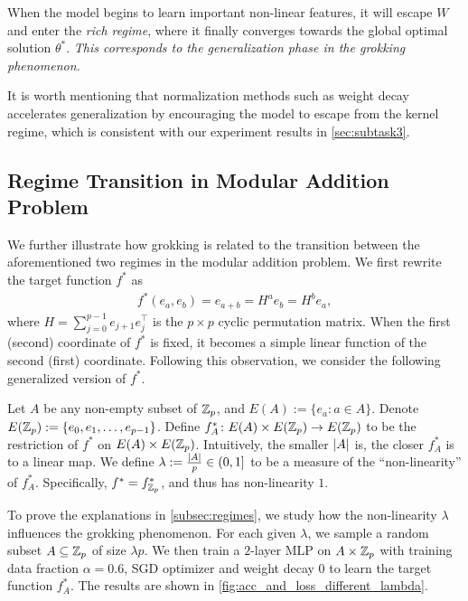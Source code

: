 When the model begins to learn important non-linear features, it will escape $W$ and enter the \emph{rich regime}, where it finally converges towards the global optimal solution $\theta^*$.
\emph{This corresponds to the generalization phase in the grokking phenomenon.}

It is worth mentioning that normalization methods such as weight decay accelerates generalization by encouraging the model to escape from the kernel regime, which is consistent with our experiment results in \cref{sec:subtask3}.


\subsection{Regime Transition in Modular Addition Problem}
\label{subsec:explain_by_regimes}

We further illustrate how grokking is related to the transition between the aforementioned two regimes in the modular addition problem.
We first rewrite the target function $f^*$ as 
\begin{align*}
    f^*(e_a, e_b) = e_{a+b} = H^a e_b = H^b e_a, 
\end{align*}
where $H = \sum_{j=0}^{p-1} e_{j+1} e_{j}^\top$ is the $p \times p$ cyclic permutation matrix.
When the first (second) coordinate of $f^*$ is fixed, it becomes a simple linear function of the second (first) coordinate.
Following this observation, we consider the following generalized version of $f^*$.

Let $A$ be any non-empty subset of $\mathbb{Z}_p$, and $E(A) := \{e_a \colon a \in A\}$. Denote $E(\mathbb{Z}_p) := \{e_0, e_1, \dots, e_{p-1}\}$.
Define $f_A^* \colon E(A) \times E(\mathbb{Z}_p) \to E(\mathbb{Z}_p)$ to be the restriction of $f^*$ on $E(A) \times E(\mathbb{Z}_p)$.
Intuitively, the smaller $| A |$ is, the closer $f_A^*$ is to a linear map.
We define $\lambda := \frac{| A |}{p} \in (0, 1]$ to be a measure of the ``non-linearity'' of $f_A^*$.
Specifically, $f^* = f_{\mathbb{Z}_p}^*$, and thus has non-linearity $1$.

To prove the explanations in \cref{subsec:regimes}, we study how the non-linearity $\lambda$ influences the grokking phenomenon.
For each given $\lambda$, we sample a random subset $A \subseteq \mathbb{Z}_p$ of size $\lambda p$.
We then train a $2$-layer MLP on $A \times \mathbb{Z}_p$ with training data fraction $\alpha = 0.6$, SGD optimizer and weight decay $0$ to learn the target function $f_A^*$.
The results are shown in \cref{fig:acc_and_loss_different_lambda}.

